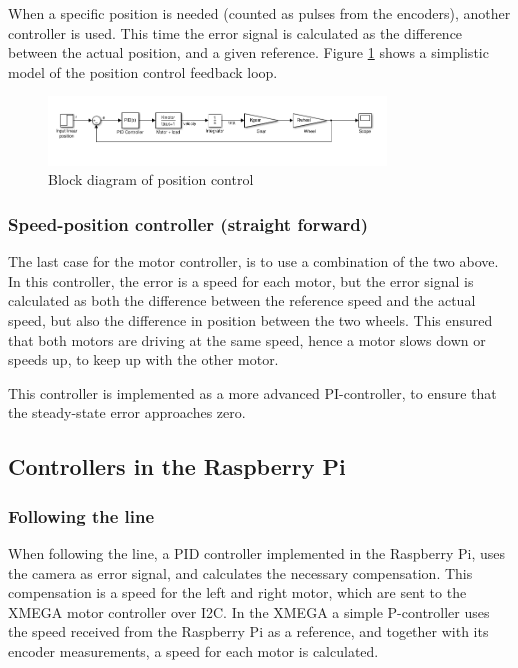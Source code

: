 When a specific position is needed (counted as pulses from the encoders), another controller is used. This time the error signal is calculated as the difference between the actual position, and a given reference. Figure \ref{fig:control_2} shows a simplistic model of the position control feedback loop.

\begin{figure}[!ht]
	\centering
	\includegraphics[width=0.8\textwidth]{resources/position_blockdiagram}
	\caption{Block diagram of position control}
	\label{fig:control_2}
\end{figure}

\subsubsection{Speed-position controller (straight forward)}

The last case for the motor controller, is to use a combination of the two above. In this controller, the error is a speed for each motor, but the error signal is calculated as both the difference between the reference speed and the actual speed, but also the difference in position between the two wheels. This ensured that both motors are driving at the same speed, hence a motor slows down or speeds up, to keep up with the other motor.

This controller is implemented as a more advanced PI-controller, to ensure that the steady-state error approaches zero. 

%
%
%
%
\subsection{Controllers in the Raspberry Pi}

\subsubsection{Following the line}
When following the line, a PID controller implemented in the Raspberry Pi, uses the camera as error signal, and calculates the necessary compensation. This compensation is a speed for the left and right motor, which are sent to the XMEGA motor controller over I2C. In the XMEGA a simple P-controller uses the speed received from the Raspberry Pi as 
a reference, and together with its encoder measurements, a speed for each motor is calculated.

